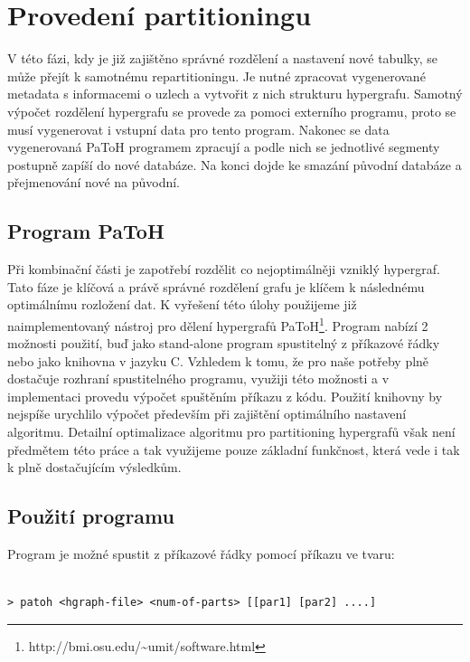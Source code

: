 \documentclass[thesis=M,czech]{FITthesis}[2012/06/26]
\begin{document}
\section{Provedení partitioningu}
V této fázi, kdy je již zajištěno správné rozdělení a nastavení nové tabulky, se může přejít k samotnému repartitioningu. Je nutné zpracovat vygenerované metadata s informacemi o uzlech a vytvořit z nich strukturu hypergrafu. Samotný výpočet rozdělení hypergrafu se provede za pomoci externího programu, proto se musí vygenerovat i vstupní data pro tento program. Nakonec se data vygenerovaná PaToH programem zpracují a podle nich se jednotlivé segmenty postupně zapíší do nové databáze. Na konci dojde ke smazání původní databáze a přejmenování nové na původní.
\subsection{Program PaToH}
Při kombinační části je zapotřebí rozdělit co nejoptimálněji vzniklý hypergraf. Tato fáze je klíčová a právě správné rozdělení grafu je klíčem k následnému optimálnímu rozložení dat. K vyřešení této úlohy použijeme již naimplementovaný nástroj pro dělení hypergrafů PaToH\footnote{http://bmi.osu.edu/\textasciitilde umit/software.html}. Program nabízí 2 možnosti použití, buď jako stand-alone program spustitelný z příkazové řádky nebo jako knihovna v jazyku C. Vzhledem k tomu, že pro naše potřeby plně dostačuje rozhraní spustitelného programu, využiji této možnosti a v implementaci provedu výpočet spuštěním příkazu z kódu. Použití knihovny by nejspíše urychlilo výpočet především při zajištění optimálního nastavení algoritmu. Detailní optimalizace algoritmu pro partitioning hypergrafů však není předmětem této práce a tak využijeme pouze základní funkčnost, která vede i tak k plně dostačujícím výsledkům.

\subsection{Použití programu}
Program je možné spustit z příkazové řádky pomocí příkazu ve tvaru:
\medskip
\begin{lstlisting}[frame=single]  % Start your code-block
 
> patoh <hgraph-file> <num-of-parts> [[par1] [par2] ....]

\end{lstlisting}
\medskip
\end{document}

